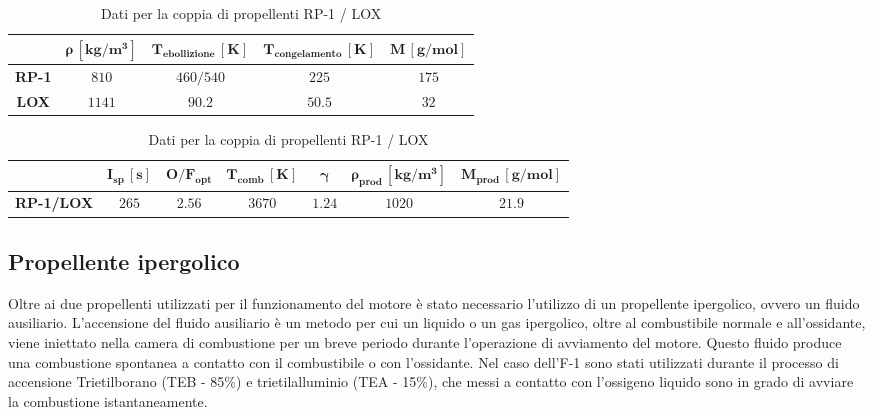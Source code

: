 \begin{table}[H]

\centering
\begin{tabular}{|c|c|c|c|c|}
\hline
& $\bm{\rho \, [kg/m^3]}$ & $\bm{T_{ebollizione} \, [K]}$ & $\bm{T_{congelamento} \, [K]}$ & $\bm{M \, [g/mol]}$ \\
\hline
\textbf{RP-1} & $810$ & $460 / 540$ & $225$ & $175$ \\
\hline
\textbf{LOX} & $1141$ & $90.2$ & $50.5$ & $32$ \\
\hline
\end{tabular}

\vspace{5pt}

\begin{tabular}{|c|c|c|c|c|c|c|}
\hline
& $\bm{I_{sp} \, [s]}$ & $\bm{O/F_{opt}}$ & $\bm{T_{comb} \, [K]}$ & $\bm{\gamma}$ & $\bm{\rho_{prod} \, [kg/m^3]}$ & $\bm{M_{prod} \, [g/mol]}$ \\
\hline
\textbf{RP-1/LOX} & $265$ & $2.56$ & $3670$ & $1.24$ & $1020$ & $21.9$ \\
\hline
\end{tabular}

\caption{Dati per la coppia di propellenti RP-1 / LOX}
\label{table:dati_propellenti}

\end{table}

\subsection{Propellente ipergolico}
\label{subsec:propellente_ipergolico}

Oltre ai due propellenti utilizzati per il funzionamento del motore è stato necessario l’utilizzo di un propellente ipergolico, ovvero un fluido ausiliario.
L'accensione del fluido ausiliario è un metodo per cui un liquido o un gas ipergolico, oltre al combustibile normale e all'ossidante, viene iniettato nella camera di combustione per un breve periodo durante l'operazione di avviamento del motore. Questo fluido produce una combustione spontanea a contatto con il combustibile o con l'ossidante.
Nel caso dell’F-1 sono stati utilizzati durante il processo di accensione Trietilborano (TEB - 85\%) e trietilalluminio (TEA - 15\%), che messi a contatto con l’ossigeno liquido sono in grado di avviare la combustione istantaneamente.